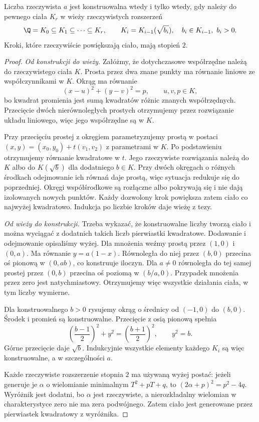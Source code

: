 \begin{twierdzenie}
Liczba rzeczywista $a$ jest konstruowalna wtedy i tylko wtedy, gdy należy do pewnego ciała $K_r$ w wieży rzeczywistych rozszerzeń
\[
\Q=K_0\subseteq K_1\subseteq\cdots\subseteq K_r,\qquad
K_i=K_{i-1}(\sqrt{b_i}),\quad b_i\in K_{i-1},\ b_i>0.
\]
Kroki, które rzeczywiście powiększają ciało, mają stopień $2$.
\end{twierdzenie}
\begin{proof}
\emph{Od konstrukcji do wieży.} Załóżmy, że dotychczasowe współrzędne należą do rzeczywistego ciała $K$. Prosta przez dwa znane punkty ma równanie liniowe ze współczynnikami w $K$. Okrąg ma równanie
\[
(x-u)^2+(y-v)^2=p,\qquad u,v,p\in K,
\]
bo kwadrat promienia jest sumą kwadratów różnic znanych współrzędnych. Przecięcie dwóch nierównoległych prostych otrzymujemy przez rozwiązanie układu liniowego, więc jego współrzędne są w $K$.

Przy przecięciu prostej z okręgiem parametryzujemy prostą w postaci $(x,y)=(x_0,y_0)+t(v_1,v_2)$ z parametrami w $K$. Po podstawieniu otrzymujemy równanie kwadratowe w $t$. Jego rzeczywiste rozwiązania należą do $K$ albo do $K(\sqrt b)$ dla dodatniego $b\in K$. Przy dwóch okręgach o różnych środkach odejmowanie ich równań daje prostą, więc sytuacja redukuje się do poprzedniej. Okręgi współśrodkowe są rozłączne albo pokrywają się i nie dają izolowanych nowych punktów. Każdy dozwolony krok powiększa zatem ciało co najwyżej kwadratowo. Indukcja po liczbie kroków daje wieżę z tezy.

\emph{Od wieży do konstrukcji.} Trzeba wykazać, że konstruowalne liczby tworzą ciało i można wyciągać z dodatnich takich liczb pierwiastki kwadratowe. Dodawanie i odejmowanie opisaliśmy wyżej. Dla mnożenia weźmy prostą przez $(1,0)$ i $(0,a)$. Ma równanie $y=a(1-x)$. Równoległa do niej przez $(b,0)$ przecina oś pionową w $(0,ab)$, co konstruuje iloczyn. Dla $a\ne0$ równoległa do tej samej prostej przez $(0,b)$ przecina oś poziomą w $(b/a,0)$. Przypadek mnożenia przez zero jest natychmiastowy. Otrzymujemy więc wszystkie działania ciała, w tym liczby wymierne.

Dla konstruowalnego $b>0$ rysujemy okrąg o średnicy od $(-1,0)$ do $(b,0)$. Środek i promień są konstruowalne. Przecięcie z osią pionową spełnia
\[
\left(\frac{b-1}{2}\right)^2+y^2=\left(\frac{b+1}{2}\right)^2,
\qquad y^2=b.
\]
Górne przecięcie daje $\sqrt b$. Indukcyjnie wszystkie elementy każdego $K_i$ są więc konstruowalne, a w szczególności $a$.

Każde rzeczywiste rozszerzenie stopnia $2$ ma używaną wyżej postać: jeżeli generuje je $\alpha$ o wielomianie minimalnym $T^2+pT+q$, to $(2\alpha+p)^2=p^2-4q$. Wyróżnik jest dodatni, bo $\alpha$ jest rzeczywiste, a nierozkładalny wielomian w charakterystyce zero nie ma zera podwójnego. Zatem ciało jest generowane przez pierwiastek kwadratowy z wyróżnika.
\end{proof}

